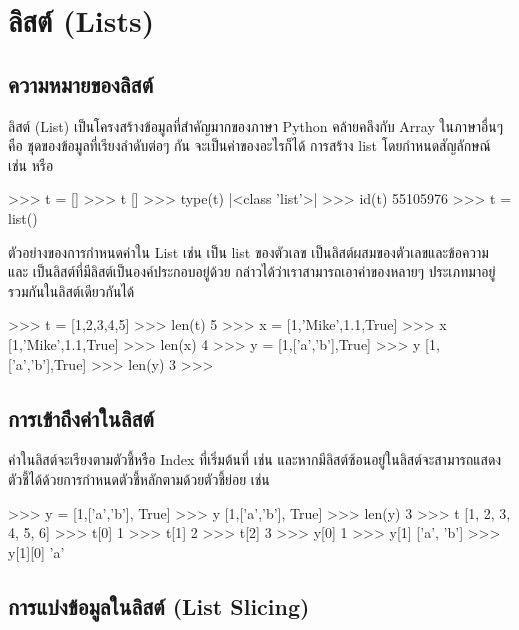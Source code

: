 \chapter{ลิสต์ (Lists)}
\section{ความหมายของลิสต์}

ลิสต์ (List) เป็นโครงสร้างข้อมูลที่สำคัญมากของภาษา Python คล้ายคลึงกับ Array ในภาษาอื่นๆ คือ ชุดของข้อมูลที่เรียงลำดับต่อๆ กัน จะเป็นค่าของอะไรก็ได้ การสร้าง list โดยกำหนดสัญลักษณ์  \pyinline{[]} เช่น   หรือ  

\begin{codelist}{}{}
>>> t = []
>>> t
[]
>>> type(t)
|<class \rq{}list\rq{}>|
>>> id(t)
55105976
>>> t = list()
\end{codelist}


ตัวอย่างของการกำหนดค่าใน List เช่น   เป็น list ของตัวเลข   เป็นลิสต์ผสมของตัวเลขและข้อความ และ   เป็นลิสต์ที่มีลิสต์เป็นองค์ประกอบอยู่ด้วย กล่าวได้ว่าเราสามารถเอาค่าของหลายๆ ประเภทมาอยู่รวมกันในลิสต์เดียวกันได้ 

\begin{codelist}{}{}
>>> t = [1,2,3,4,5]
>>> len(t)
5
>>> x = [1,'Mike',1.1,True]
>>> x
[1,'Mike',1.1,True]
>>> len(x)
4
>>> y = [1,['a','b'],True]
>>> y
[1,['a','b'],True]
>>> len(y)
3
>>>
\end{codelist}


\section{การเข้าถึงค่าในลิสต์}

ค่าในลิสต์จะเรียงตามตัวชี้หรือ Index ที่เริ่มต้นที่   เช่น  และหากมีลิสต์ซ้อนอยู่ในลิสต์จะสามารถแสดงตัวชี้ได้ด้วยการกำหนดตัวชี้หลักตามด้วยตัวชี้ย่อย เช่น 

\begin{codelist}{}{}
>>> y = [1,['a','b'], True]
>>> y
[1,['a','b'], True]
>>> len(y)
3
>>> t
[1, 2, 3, 4, 5, 6]
>>> t[0]
1
>>> t[1]
2
>>> t[2]
3
>>> y[0]
1
>>> y[1]
['a', 'b']
>>> y[1][0]
'a'
\end{codelist}


\section{การแบ่งข้อมูลในลิสต์ (List Slicing)}

